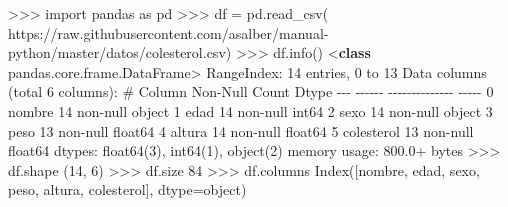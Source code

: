 \documentclass[
  spanish,
  a4paper,
]{scrreport}
\newenvironment{Shaded}{\begin{snugshade}}{\end{snugshade}}
\newcommand{\BuiltInTok}[1]{\textcolor[rgb]{0.00,0.23,0.31}{#1}}
\newcommand{\CommentTok}[1]{\textcolor[rgb]{0.37,0.37,0.37}{#1}}
\newcommand{\DecValTok}[1]{\textcolor[rgb]{0.68,0.00,0.00}{#1}}
\newcommand{\FloatTok}[1]{\textcolor[rgb]{0.68,0.00,0.00}{#1}}
\newcommand{\ImportTok}[1]{\textcolor[rgb]{0.00,0.46,0.62}{#1}}
\newcommand{\KeywordTok}[1]{\textcolor[rgb]{0.00,0.23,0.31}{\textbf{#1}}}
\newcommand{\NormalTok}[1]{\textcolor[rgb]{0.00,0.23,0.31}{#1}}
\newcommand{\OperatorTok}[1]{\textcolor[rgb]{0.37,0.37,0.37}{#1}}
\newcommand{\StringTok}[1]{\textcolor[rgb]{0.13,0.47,0.30}{#1}}
\begin{document}
\begin{Shaded}
\begin{Highlighting}[]
\OperatorTok{\textgreater{}\textgreater{}\textgreater{}} \ImportTok{import}\NormalTok{ pandas }\ImportTok{as}\NormalTok{ pd}
\OperatorTok{\textgreater{}\textgreater{}\textgreater{}}\NormalTok{ df }\OperatorTok{=}\NormalTok{ pd.read\_csv(}
\StringTok{\textquotesingle{}https://raw.githubusercontent.com/asalber/manual{-}python/master/datos/colesterol.csv\textquotesingle{}}\NormalTok{)}
\OperatorTok{\textgreater{}\textgreater{}\textgreater{}}\NormalTok{ df.info()}
\OperatorTok{\textless{}}\KeywordTok{class} \StringTok{\textquotesingle{}pandas.core.frame.DataFrame\textquotesingle{}}\OperatorTok{\textgreater{}}
\NormalTok{RangeIndex: }\DecValTok{14}\NormalTok{ entries, }\DecValTok{0}\NormalTok{ to }\DecValTok{13}
\NormalTok{Data columns (total }\DecValTok{6}\NormalTok{ columns):}
 \CommentTok{\#   Column      Non{-}Null Count  Dtype  }
\OperatorTok{{-}{-}{-}}  \OperatorTok{{-}{-}{-}{-}{-}{-}}      \OperatorTok{{-}{-}{-}{-}{-}{-}{-}{-}{-}{-}{-}{-}{-}{-}}  \OperatorTok{{-}{-}{-}{-}{-}}  
 \DecValTok{0}\NormalTok{   nombre      }\DecValTok{14}\NormalTok{ non}\OperatorTok{{-}}\NormalTok{null     }\BuiltInTok{object} 
 \DecValTok{1}\NormalTok{   edad        }\DecValTok{14}\NormalTok{ non}\OperatorTok{{-}}\NormalTok{null     int64  }
 \DecValTok{2}\NormalTok{   sexo        }\DecValTok{14}\NormalTok{ non}\OperatorTok{{-}}\NormalTok{null     }\BuiltInTok{object} 
 \DecValTok{3}\NormalTok{   peso        }\DecValTok{13}\NormalTok{ non}\OperatorTok{{-}}\NormalTok{null     float64}
 \DecValTok{4}\NormalTok{   altura      }\DecValTok{14}\NormalTok{ non}\OperatorTok{{-}}\NormalTok{null     float64}
 \DecValTok{5}\NormalTok{   colesterol  }\DecValTok{13}\NormalTok{ non}\OperatorTok{{-}}\NormalTok{null     float64}
\NormalTok{dtypes: float64(}\DecValTok{3}\NormalTok{), int64(}\DecValTok{1}\NormalTok{), }\BuiltInTok{object}\NormalTok{(}\DecValTok{2}\NormalTok{)}
\NormalTok{memory usage: }\FloatTok{800.0}\OperatorTok{+} \BuiltInTok{bytes}
\OperatorTok{\textgreater{}\textgreater{}\textgreater{}}\NormalTok{ df.shape}
\NormalTok{(}\DecValTok{14}\NormalTok{, }\DecValTok{6}\NormalTok{)}
\OperatorTok{\textgreater{}\textgreater{}\textgreater{}}\NormalTok{ df.size}
\DecValTok{84}
\OperatorTok{\textgreater{}\textgreater{}\textgreater{}}\NormalTok{ df.columns}
\NormalTok{Index([}\StringTok{\textquotesingle{}nombre\textquotesingle{}}\NormalTok{, }\StringTok{\textquotesingle{}edad\textquotesingle{}}\NormalTok{, }\StringTok{\textquotesingle{}sexo\textquotesingle{}}\NormalTok{, }\StringTok{\textquotesingle{}peso\textquotesingle{}}\NormalTok{, }\StringTok{\textquotesingle{}altura\textquotesingle{}}\NormalTok{, }\StringTok{\textquotesingle{}colesterol\textquotesingle{}}\NormalTok{], dtype}\OperatorTok{=}\StringTok{\textquotesingle{}object\textquotesingle{}}\NormalTok{)}

\end{Highlighting}
\end{Shaded}
\end{document}
